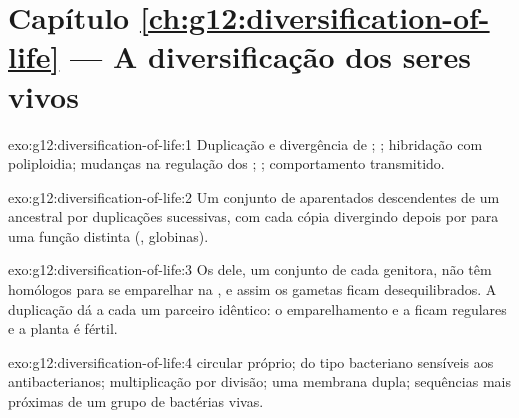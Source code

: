 \section*{Capítulo \ref{ch:g12:diversification-of-life} --- A diversificação dos seres vivos}

\begin{solution}{exo:g12:diversification-of-life:1}
Duplicação e divergência de ; ;
hibridação com poliploidia; mudanças na regulação dos ; ; comportamento transmitido.
\end{solution}

\begin{solution}{exo:g12:diversification-of-life:2}
Um conjunto de  aparentados descendentes de um  ancestral por
duplicações sucessivas, com cada cópia divergindo depois por 
para uma função distinta (, globinas).
\end{solution}

\begin{solution}{exo:g12:diversification-of-life:3}
Os  dele, um conjunto de cada  genitora, não têm
homólogos para se emparelhar na , e assim os gametas ficam
desequilibrados. A duplicação dá a cada  um parceiro
idêntico: o emparelhamento e a  ficam regulares e a planta é fértil.
\end{solution}

\begin{solution}{exo:g12:diversification-of-life:4}
 circular próprio;  do tipo bacteriano sensíveis aos
 antibacterianos; multiplicação por divisão; uma membrana
dupla; sequências mais próximas de um grupo de bactérias vivas.
\end{solution}

